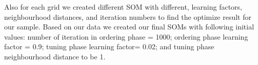      Also for each grid we created different SOM with different, learning factors, neighbourhood distances, and iteration numbers to find the optimize result for our sample.
     Based on our data we created our final SOMs with following initial values: number of iteration in ordering phase = 1000; ordering phase learning factor = 0.9; tuning phase learning factor= 0.02; and tuning phase neighbourhood distance to be 1.
     

   
